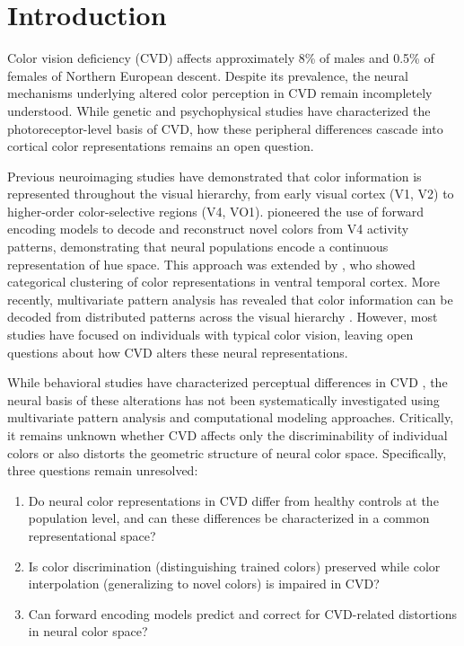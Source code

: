 
\section{Introduction}

Color vision deficiency (CVD) affects approximately 8\% of males and 0.5\% of females of Northern European descent. Despite its prevalence, the neural mechanisms underlying altered color perception in CVD remain incompletely understood. While genetic and psychophysical studies have characterized the photoreceptor-level basis of CVD, how these peripheral differences cascade into cortical color representations remains an open question.

Previous neuroimaging studies have demonstrated that color information is represented throughout the visual hierarchy, from early visual cortex (V1, V2) to higher-order color-selective regions (V4, VO1). \textcite{brouwer2009} pioneered the use of forward encoding models to decode and reconstruct novel colors from V4 activity patterns, demonstrating that neural populations encode a continuous representation of hue space. This approach was extended by \textcite{brouwer2013}, who showed categorical clustering of color representations in ventral temporal cortex. More recently, multivariate pattern analysis has revealed that color information can be decoded from distributed patterns across the visual hierarchy \cite{haxby2011}. However, most studies have focused on individuals with typical color vision, leaving open questions about how CVD alters these neural representations.

While behavioral studies have characterized perceptual differences in CVD \cite{brettel1997}, the neural basis of these alterations has not been systematically investigated using multivariate pattern analysis and computational modeling approaches. Critically, it remains unknown whether CVD affects only the discriminability of individual colors or also distorts the geometric structure of neural color space. Specifically, three questions remain unresolved:

\begin{enumerate}
\item Do neural color representations in CVD differ from healthy controls at the population level, and can these differences be characterized in a common representational space?
\item Is color discrimination (distinguishing trained colors) preserved while color interpolation (generalizing to novel colors) is impaired in CVD?
\item Can forward encoding models predict and correct for CVD-related distortions in neural color space?
\end{enumerate}


